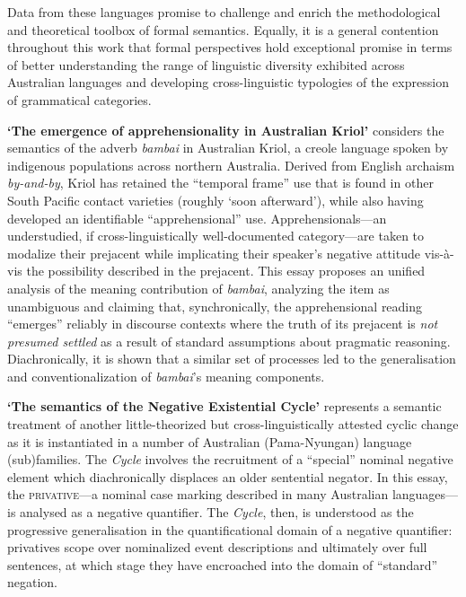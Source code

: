 {Data from these languages promise to challenge and enrich the methodological and theoretical toolbox of formal semantics. Equally, it is a general contention throughout this work that formal perspectives hold exceptional promise in terms of better understanding the range of linguistic diversity exhibited across Australian languages and developing cross-linguistic typologies of the expression of grammatical categories.

\textbf{‘The emergence of apprehensionality in Australian Kriol’} considers the semantics of the adverb \textit{bambai} in Australian Kriol, a creole language spoken by indigenous populations across northern Australia. Derived from English archaism \textit{by-and-by}, %
Kriol has retained the ``temporal frame'' use that is found in other South Pacific contact varieties (roughly `soon afterward'), while  also having developed an identifiable ``apprehensional'' use. Apprehensionals---an understudied, if cross-linguistically well-documented category---are taken to modalize their prejacent while implicating their speaker's negative attitude vis-à-vis the possibility described in the prejacent. This essay proposes an unified analysis of the meaning contribution of \textit{bambai}, analyzing the item as unambiguous and claiming that, synchronically, the apprehensional reading ``emerges'' reliably in discourse contexts where the truth of its prejacent is \textit{not presumed settled} as a result of standard assumptions about pragmatic reasoning. Diachronically, it is shown that a similar set of processes led to the generalisation and conventionalization of \textit{bambai}'s meaning components.

\textbf{‘The semantics of the Negative Existential Cycle’} represents a semantic treatment of another little-theorized but cross-linguistically attested cyclic change as it is instantiated in a number of Australian (Pama-Nyungan) language (sub)families. The \textit{Cycle} involves the recruitment of a ``special'' nominal negative element which diachronically displaces an older sentential negator. In this essay, the \textsc{privative}---a nominal case marking described in many Australian languages---is analysed as a negative quantifier. The \textit{Cycle}, then, is understood as the progressive generalisation in the quantificational domain of a negative quantifier: privatives scope over nominalized event descriptions and ultimately over full sentences, at which stage they have encroached into the domain of ``standard'' negation.

}

